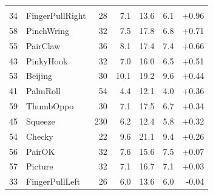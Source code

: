 \begin{table}[h]
\begin{tabular}{rlrrrrr}
\addlinespace[3pt]
\multicolumn{7}{l}{\textit{Asymmetric bimanual gestures}} \\
34 & FingerPullRight & 28  & 7.1 & 13.6 & 6.1 & +0.96 \\
58 & PinchWring      & 32  & 7.5 & 17.8 & 6.8 & +0.71 \\
55 & PairClaw        & 36  & 8.1 & 17.4 & 7.4 & +0.66 \\
43 & PinkyHook       & 32  & 7.0 & 16.0 & 6.5 & +0.51 \\
53 & Beijing         & 30  & 10.1 & 19.2 & 9.6 & +0.44 \\
41 & PalmRoll        & 54  & 4.4 & 12.1 & 4.0 & +0.36 \\
59 & ThumbOppo       & 30  & 7.1 & 17.5 & 6.7 & +0.34 \\
45 & Squeeze         & 230 & 6.2 & 12.4 & 5.8 & +0.32 \\
54 & Checky          & 22  & 9.6 & 21.1 & 9.4 & +0.26 \\
56 & PairOK          & 32  & 7.6 & 15.6 & 7.5 & +0.07 \\
57 & Picture         & 32  & 7.1 & 16.7 & 7.1 & +0.03 \\
33 & FingerPullLeft  & 26  & 6.0 & 13.6 & 6.0 & -0.04 \\

\bottomrule
\end{tabular}
\end{table}
